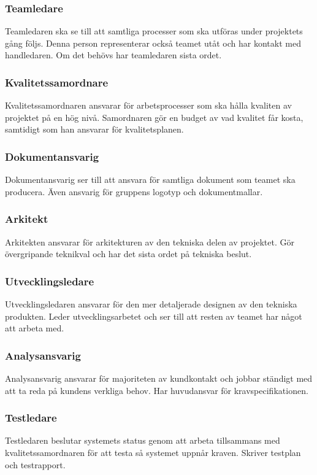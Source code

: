 \subsubsection*{Teamledare}
Teamledaren ska se till att samtliga processer som ska utföras under projektets gång följs. Denna person representerar också teamet utåt och har kontakt med handledaren. Om det behövs har teamledaren sista ordet.

\subsubsection*{Kvalitetssamordnare}
Kvalitetssamordnaren ansvarar för arbetsprocesser som ska hålla kvaliten av projektet på en hög nivå. Samordnaren gör en budget av vad kvalitet får kosta, samtidigt som han ansvarar för kvalitetsplanen.

\subsubsection*{Dokumentansvarig}
Dokumentansvarig ser till att ansvara för samtliga dokument som teamet ska producera. Även ansvarig för gruppens logotyp och dokumentmallar.

\subsubsection*{Arkitekt}
Arkitekten ansvarar för arkitekturen av den tekniska delen av projektet. Gör övergripande teknikval och har det sista ordet på tekniska beslut.

\subsubsection*{Utvecklingsledare}
Utvecklingsledaren ansvarar för den mer detaljerade designen av den tekniska produkten. Leder utvecklingsarbetet och ser till att resten av teamet har något att arbeta med.

\subsubsection*{Analysansvarig}
Analysansvarig ansvarar för majoriteten av kundkontakt och jobbar ständigt med att ta reda på kundens verkliga behov. Har huvudansvar för kravspecifikationen.

\subsubsection*{Testledare}
Testledaren beslutar systemets status genom att arbeta tillsammans med kvalitetssamordnaren för att testa så systemet uppnår kraven. Skriver testplan och testrapport.

